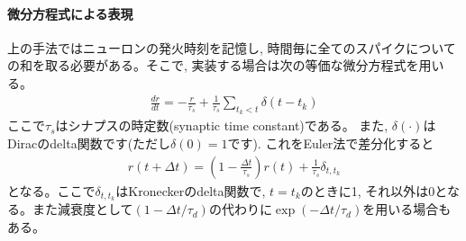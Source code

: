\documentclass[letterpaper,10pt,english]{sphinxmanual}
\begin{document}
\paragraph{微分方程式による表現}
\label{\detokenize{3-3_expo-synapse:id4}}
上の手法ではニューロンの発火時刻を記憶し, 時間毎に全てのスパイクについての和を取る必要がある。そこで, 実装する場合は次の等価な微分方程式を用いる。
\begin{equation*}
\begin{split}
\begin{equation}
\frac{dr}{dt}=-\frac{r}{\tau_{s}}+\frac{1}{\tau_{s}} \sum_{t_{k}< t} \delta\left(t-t_{k}\right)   
\end{equation}
\end{split}
\end{equation*}
ここで\(\tau_s\)はシナプスの時定数(synaptic time constant)である。 また, \(\delta(\cdot)\)はDiracのdelta関数です(ただし\(\delta(0)=1\)です). これをEuler法で差分化すると
\begin{equation*}
\begin{split}
\begin{equation}
r(t+\Delta t)=\left(1-\frac{\Delta t}{\tau_{s}}\right)r(t)+\frac{1}{\tau_{s}}\delta_{t,t_{k}} 
\end{equation}
\end{split}
\end{equation*}
となる。ここで\(\delta_{t,t_{k}}\)はKroneckerのdelta関数で, \(t=t_{k}\)のときに1, それ以外は0となる。また減衰度として\(\left(1-\Delta  t/\tau_{d}\right)\)の代わりに\(\exp\left(-\Delta t/\tau_{d}\right)\)を用いる場合もある。
\end{document}

